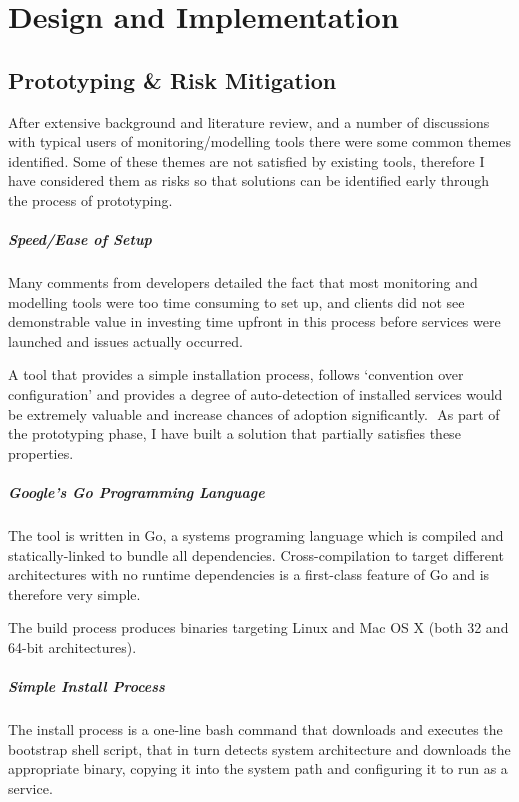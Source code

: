 \documentclass{cshonours}
\begin{document}
\chapter{Design and Implementation}

\section{Prototyping \& Risk Mitigation}

After extensive background and literature review, and a number of discussions with typical users of monitoring/modelling tools there were some common themes identified. Some of these themes are not satisfied by existing tools, therefore I have considered them as risks so that solutions can be identified early through the process of prototyping.

\paragraph{Speed/Ease of Setup} Many comments from developers detailed the fact that most monitoring and modelling tools were too time consuming to set up, and clients did not see demonstrable value in investing time upfront in this process before services were launched and issues actually occurred. 

A tool that provides a simple installation process, follows ‘convention over configuration’ and provides a degree of auto-detection of installed services would be extremely valuable and increase chances of adoption significantly.
 As part of the prototyping phase, I have built a solution that partially satisfies these properties.

\paragraph{Google's Go Programming Language} The tool is written in Go, a systems programing language which is compiled and statically-linked to bundle all dependencies. Cross-compilation to target different architectures with no runtime dependencies is a first-class feature of Go and is therefore very simple.

The build process produces binaries targeting Linux and Mac OS X (both 32 and 64-bit architectures). 

\paragraph{Simple Install Process} The install process is a one-line bash command that downloads and executes the bootstrap shell script, that in turn detects system architecture and downloads the appropriate binary, copying it into the system path and configuring it to run as a service.
\end{document}
